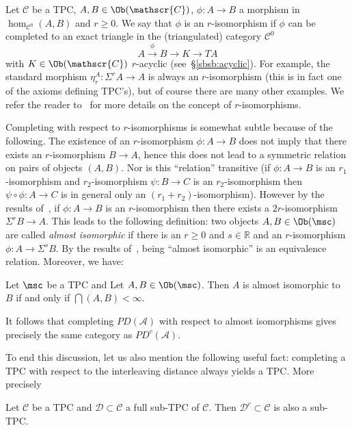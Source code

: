 Let $\mathscr{C}$ be a TPC, $A,B \in \Ob(\mathscr{C})$,
$\phi: A \longrightarrow B$ a morphism in $\hom_{\mathscr{C}^0}(A,B)$
and $r \geq 0$. We say that $\phi$ is an $r$-isomorphism if $\phi$ can
be completed to an exact triangle in the (triangulated) category
$\mathscr{C}^0$
$$A \xrightarrow{\ \phi \ } B \xrightarrow{\ \ \ }
K \xrightarrow{\ \ \ } TA$$ with $K \in \Ob(\mathscr{C})$ $r$-acyclic
(see~\S\ref{sbsb:acyclic}). For example, the standard morphism
$\eta^A_r : \Sigma^r A \longrightarrow A$ is always an $r$-isomorphism
(this is in fact one of the axioms defining TPC's), but of course
there are many other examples. We refer the reader to~\cite{BCZ:tpc}
for more details on the concept of $r$-isomorphisms.

Completing with respect to $r$-isomorphisms is somewhat subtle because
of the following. The existence of an $r$-isomorphism
$\phi: A \longrightarrow B$ does not imply that there exists an
$r$-isomorphism $B \longrightarrow A$, hence this does not lead to a
symmetric relation on pairs of objects $(A,B)$. Nor is this
``relation'' transitive (if $\phi: A \longrightarrow B$ is an
$r_1$-isomorphism and $r_2$-isomorphism $\psi: B \longrightarrow C$ is
an $r_2$-isomorphism then $\psi \circ \phi: A \longrightarrow C$ is in
general only an $(r_1+r_2)$-isomorphism). However by the results
of~\cite{BCZ:tpc}, if $\phi: A \longrightarrow B$ is an
$r$-isomorphism then there exists a $2r$-isomorphism
$\Sigma^r B \longrightarrow A$. This leads to the following
definition: two objects $A, B \in \Ob(\msc)$ are called {\em almost
  isomorphic} if there is an $r\geq 0$ and $s \in \mathbb{R}$ and an
$r$-isomorphism $\phi: A \longrightarrow \Sigma^s B$. By the results
of~\cite{BCZ:tpc}, being ``almost isomorphic'' is an equivalence
relation. Moreover, we have:
\begin{lem} \label{l:a-iso} Let $\msc$ be a TPC and Let
  $A, B \in \Ob(\msc)$. Then $A$ is almost isomorphic to $B$ if and
  only if $\dint(A,B) < \infty$.
\end{lem}
It follows that completing $PD(\mathcal{A})$ with respect to almost
isomorphisms gives precisely the same category as $PD^c(\mathcal{A})$.

To end this discussion, let us also mention the following useful fact:
completing a TPC with respect to the interleaving distance always
yields a TPC. More precisely
\begin{lem} \label{l:cmp-TPC} Let $\mathscr{C}$ be a TPC and
  $\mathscr{D} \subset \mathscr{C}$ a full sub-TPC of
  $\mathscr{C}$. Then $\mathscr{D}^{c} \subset \mathscr{C}$ is also a
  sub-TPC.
\end{lem}

